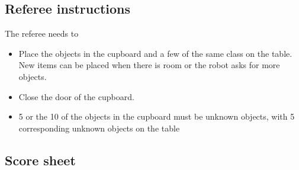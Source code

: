\subsection{Referee instructions}

The referee needs to
\begin{itemize}
\item Place the objects in the cupboard and a few of the same class on the table. New items can be placed when there is room or the robot asks for more objects. 
\item Close the door of the cupboard. 
\item 5 or the 10 of the objects in the cupboard must be unknown objects, with 5 corresponding unknown objects on the table
\end{itemize}

\subsection{Score sheet}


